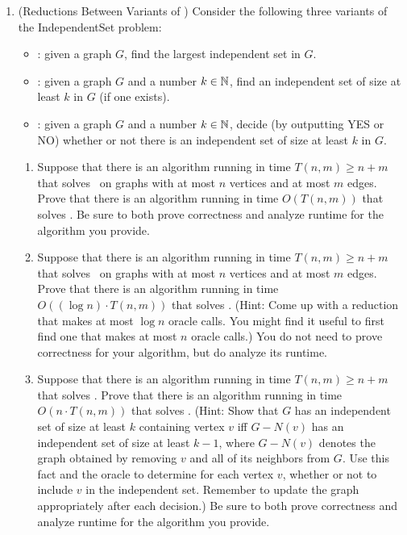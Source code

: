 \documentclass[11pt]{article}
\begin{document}
\begin{enumerate}
  \item (Reductions Between Variants of \IndependentSet) 
 Consider the following three variants of the IndependentSet problem:
 \begin{itemize}
     \item \IndependentSetOptimizationSearch: given a graph $G$, find the largest independent set in $G$.
     \item \IndependentSetThresholdSearch: given a graph $G$ and a number $k\in \mathbb{N}$, find an independent set of size at least $k$ in $G$ (if one exists).
     \item \IndependentSetThresholdDecision: given a graph $G$ and a number $k\in \mathbb{N}$, decide (by outputting YES or NO) whether or not there is an independent set of size at least $k$ in $G$. 
 \end{itemize}

 \begin{enumerate}
 \item Suppose that there is an algorithm running in time $T(n,m)\geq n+m$ that solves \IndependentSetOptimizationSearch\ on graphs with at most $n$ vertices and at most $m$ edges.  Prove that there is an algorithm running in time $O(T(n,m))$ that solves \IndependentSetThresholdDecision. Be sure to both prove correctness and analyze runtime for the algorithm you provide.


 
  
 
 \item Suppose that there is an algorithm running in time $T(n,m)\geq n+m$ that solves \IndependentSetThresholdSearch\ on graphs with at most $n$ vertices and at most $m$ edges.  Prove that there is an algorithm running in time $O((\log n)\cdot T(n,m))$ that solves \IndependentSetOptimizationSearch.  (Hint: Come up with a reduction that makes at most $\log n$ oracle calls.  You might find it useful to first find one that makes at most $n$ oracle calls.) You do not need to prove correctness for your algorithm, but do analyze its runtime.




 
 
  \item Suppose that there is an algorithm 
 running in time $T(n,m)\geq n+m$ that solves \IndependentSetThresholdDecision.   Prove that there is an algorithm running in time $O(n\cdot T(n,m))$ that solves \IndependentSetThresholdSearch.
(Hint: Show that $G$ has an independent set of size at least $k$ containing vertex $v$ iff $G-N(v)$ has an independent set of size at least $k-1$, where $G-N(v)$ denotes the graph obtained by removing $v$ and all of its neighbors from $G$.  Use this fact and the oracle to determine for each vertex $v$, whether or not to include $v$ in the independent set.  Remember to update the graph appropriately after each decision.) Be sure to both prove correctness and analyze runtime for the algorithm you provide.





\end{enumerate}
\end{enumerate}
\end{document}
